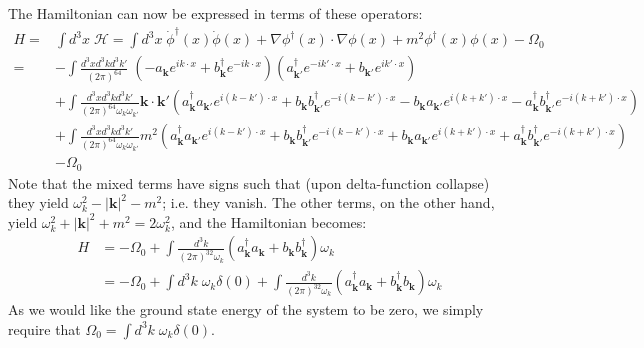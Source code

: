 \documentclass{mathnotes}
\begin{document}
The Hamiltonian can now be expressed in terms of these operators:
\begin{align*}
    H=&\int d^3x\;\mathcal{H}=\int d^3x\;\dot{\phi}^\dagger(x)\dot{\phi}(x)+\nabla\phi^\dagger(x)\cdot\nabla\phi(x)+m^2\phi^\dagger(x)\phi(x)-\Omega_0\\
    =&-\int \frac{d^3xd^3kd^3k'}{(2\pi)^64}\;\left(-a_\mathbf{k}e^{ik\cdot x}+b^\dagger_\mathbf{k}e^{-ik\cdot x}\right)\left( a_\mathbf{k'}^\dagger e^{-ik'\cdot x}+b_\mathbf{k'}e^{ik'\cdot x} \right)\\
    &+\int \frac{d^3xd^3kd^3k'}{(2\pi)^64\omega_k\omega_{k'}}\mathbf{k}\cdot\mathbf{k}'\left( a^\dagger_\mathbf{k}a_{\mathbf{k}'}e^{i(k-k')\cdot x}+b_\mathbf{k}b^\dagger_{\mathbf{k}'}e^{-i(k-k')\cdot x} -b_\mathbf{k}a_{\mathbf{k}'}e^{i(k+k')\cdot x}-a^\dagger_\mathbf{k} b^\dagger_{\mathbf{k}'}e^{-i(k+k')\cdot x}\right)\\
    &+\int\frac{d^3xd^3kd^3k'}{(2\pi)^64\omega_k\omega_{k'}}m^2\left(a^\dagger_\mathbf{k}a_{\mathbf{k}'}e^{i(k-k')\cdot x}+b_\mathbf{k}b^\dagger_{\mathbf{k}'}e^{-i(k-k')\cdot x} +b_\mathbf{k}a_{\mathbf{k}'}e^{i(k+k')\cdot x}+a^\dagger_\mathbf{k} b^\dagger_{\mathbf{k}'}e^{-i(k+k')\cdot x} \right)\\
    &-\Omega_0
\end{align*}
Note that the mixed terms have signs such that (upon delta-function collapse) they yield $\omega_k^2-|\mathbf{k}|^2-m^2$; i.e. they vanish. The other terms, on the other hand, yield
$\omega_k^2+|\mathbf{k}|^2+m^2=2\omega_k^2$, and the Hamiltonian becomes:
\begin{align*}
    H&=-\Omega_0+\int \frac{d^3k}{(2\pi)^32\omega_k}\left( a_\mathbf{k}^\dagger a_\mathbf{k}+b_\mathbf{k}b^\dagger_\mathbf{k} \right)\omega_k\\
    &=-\Omega_0+\int d^3k\;\omega_k\delta(0)+\int \frac{d^3k}{(2\pi)^32\omega_k}\left( a_\mathbf{k}^\dagger a_\mathbf{k}+b^\dagger_\mathbf{k} b_\mathbf{k}\right)\omega_k
\end{align*}
As we would like the ground state energy of the system to be zero, we simply require that $\Omega_0=\int d^3k\;\omega_k\delta(0)$.
\end{document}
